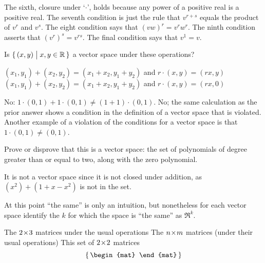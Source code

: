 \begin{exercises}
\begin{answer}
      The sixth, closure under `\( \cdot \)', 
      holds because any power of a positive real is a
      positive real.
      The seventh condition is just the rule that \( v^{r+s} \) equals
      the product of \( v^r \) and \( v^s \).
      The eight condition says that \( (vw)^r=v^rw^r \).
      The ninth condition asserts that \( (v^r)^s=v^{rs} \).
      The final condition says that \( v^1=v \).  
    \end{answer}
  \item 
      Is \( \mbox{$\{\,(x,y)\bigm| x,y\in\mathbb{R}\,\}$} \) a vector space under
      these operations?
      \begin{exparts}
        \partsitem \( (x_1,y_1)+(x_2,y_2)=(x_1+x_2,y_1+y_2) \)
        and \( r\cdot (x,y)=(rx,y) \)
        \partsitem \( (x_1,y_1)+(x_2,y_2)=(x_1+x_2,y_1+y_2) \)
        and \( r\cdot (x,y)=(rx,0) \)
      \end{exparts}
      \begin{answer}
        \begin{exparts}
           \partsitem No: \( 1\cdot(0,1)+1\cdot(0,1)\neq (1+1)\cdot(0,1) \).
           \partsitem No; the same calculation as the prior answer shows
              a condition in the definition of a vector space that is 
              violated. 
              Another example of a violation of the conditions for a 
              vector space is that \( 1\cdot (0,1)\neq (0,1) \). 
        \end{exparts}  
      \end{answer}
  \item 
    Prove or disprove that 
    this is a vector space: the set of polynomials of
    degree greater than or equal to two, along with the zero polynomial.
    \begin{answer}
      It is not a vector space since it is not closed under addition, as
      \( (x^2)+(1+x-x^2) \) is not in the set.  
    \end{answer}
  \item 
    At this point ``the same'' is only an
    intuition, but nonetheless for each vector space identify the
    \( k \) for which the space is ``the same'' as \( \Re^k \).
    \begin{exparts}
      \partsitem The \( 2 \! \times \! 3 \) matrices under the usual operations
      \partsitem The \( n \! \times \! m \) matrices (under their usual operations)
      \partsitem This set of \( 2 \! \times \! 2 \) matrices
        \begin{equation*}
          \set{\begin{mat}

\end{mat}}
\end{equation*}
\end{exparts}
\end{exercises}
